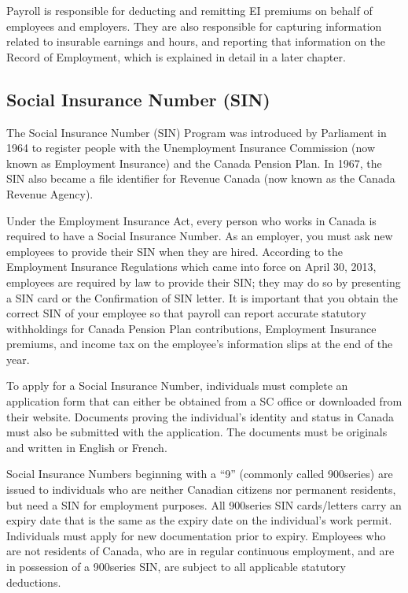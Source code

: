 \documentclass[letterpaper,10pt,english]{sphinxmanual}
\begin{document}
\sphinxAtStartPar
Payroll is responsible for deducting and remitting EI premiums on behalf of employees and
employers. They are also responsible for capturing information related to insurable earnings
and hours, and reporting that information on the Record of Employment, which is explained
in detail in a later chapter.


\subsection{Social Insurance Number (SIN)}
\label{\detokenize{2_compliance:social-insurance-number-sin}}
\sphinxAtStartPar
The Social Insurance Number (SIN) Program was introduced by Parliament in 1964 to
register people with the Unemployment Insurance Commission (now known as Employment
Insurance) and the Canada Pension Plan. In 1967, the SIN also became a file identifier for
Revenue Canada (now known as the Canada Revenue Agency).

\sphinxAtStartPar
Under the Employment Insurance Act, every person who works in Canada is required to have
a Social Insurance Number. As an employer, you must ask new employees to provide their
SIN when they are hired. According to the Employment Insurance Regulations which came
into force on April 30, 2013, employees are required by law to provide their SIN; they may
do so by presenting a SIN card or the Confirmation of SIN letter. It is important that you
obtain the correct SIN of your employee so that payroll can report accurate statutory
withholdings for Canada Pension Plan contributions, Employment Insurance premiums, and
income tax on the employee’s information slips at the end of the year.

\sphinxAtStartPar
To apply for a Social Insurance Number, individuals must complete an application form that
can either be obtained from a SC office or downloaded from their website. Documents
proving the individual’s identity and status in Canada must also be submitted with the
application. The documents must be originals and written in English or French.

\sphinxAtStartPar
Social Insurance Numbers beginning with a “9” (commonly called 900\sphinxhyphen{}series) are issued to
individuals who are neither Canadian citizens nor permanent residents, but need a SIN for
employment purposes. All 900\sphinxhyphen{}series SIN cards/letters carry an expiry date that is the same
as the expiry date on the individual’s work permit. Individuals must apply for new
documentation prior to expiry. Employees who are not residents of Canada, who are in
regular continuous employment, and are in possession of a 900\sphinxhyphen{}series SIN, are subject to all
applicable statutory deductions.
\end{document}

